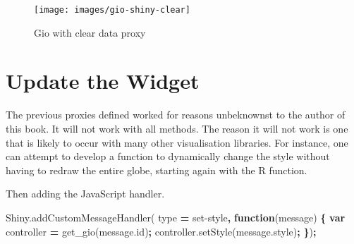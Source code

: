 \documentclass[
  10pt,
]{krantz}
\makeatletter
\newenvironment{Shaded}{\begin{snugshade}}{\end{snugshade}}
\newcommand{\AttributeTok}[1]{\textcolor[rgb]{0.61,0.61,0.61}{#1}}
\newcommand{\CommentTok}[1]{\textcolor[rgb]{0.37,0.37,0.37}{\textit{#1}}}
\newcommand{\ControlFlowTok}[1]{\textcolor[rgb]{0.27,0.27,0.27}{\textbf{#1}}}
\newcommand{\DataTypeTok}[1]{\textcolor[rgb]{0.27,0.27,0.27}{#1}}
\newcommand{\KeywordTok}[1]{\textcolor[rgb]{0.27,0.27,0.27}{\textbf{#1}}}
\newcommand{\NormalTok}[1]{#1}
\newcommand{\OperatorTok}[1]{\textcolor[rgb]{0.43,0.43,0.43}{\textbf{#1}}}
\newcommand{\StringTok}[1]{\textcolor[rgb]{0.5,0.5,0.5}{#1}}
\newcommand{\VariableTok}[1]{\textcolor[rgb]{0,0,0}{#1}}
\newenvironment{kframe}{%
\medskip{}
\setlength{\fboxsep}{.8em}
 \def\at@end@of@kframe{}%
 \ifinner\ifhmode%
  \def\at@end@of@kframe{\end{minipage}}%
  \begin{minipage}{\columnwidth}%
 \fi\fi%
 \def\FrameCommand##1{\hskip\@totalleftmargin \hskip-\fboxsep
 \colorbox{shadecolor}{##1}\hskip-\fboxsep
     \hskip-\linewidth \hskip-\@totalleftmargin \hskip\columnwidth}%
 \MakeFramed {\advance\hsize-\width
   \@totalleftmargin\z@ \linewidth\hsize
   \@setminipage}}%
 {\par\unskip\endMakeFramed%
 \at@end@of@kframe}
\renewenvironment{Shaded}{\begin{kframe}}{\end{kframe}}
\makeatother
\begin{document}
\begin{figure}[H]

{\centering \texttt{[image: images/gio-shiny-clear]} 

}

\caption{Gio with clear data proxy}\label{fig:giod-shiny-clear-data}
\end{figure}

\hypertarget{shiny-widgets-update}{%
\section{Update the Widget}\label{shiny-widgets-update}}

The previous proxies defined worked for reasons unbeknownst to the author of this book. It will not work with all methods. The reason it will not work is one that is likely to occur with many other visualisation libraries. For instance, one can attempt to develop a function to dynamically change the style without having to redraw the entire globe, starting again with the R function.

\begin{Shaded}
\end{Shaded}

Then adding the JavaScript handler.

\begin{Shaded}
\begin{Highlighting}[]
\VariableTok{Shiny}\NormalTok{.}\AttributeTok{addCustomMessageHandler}\NormalTok{(}
\NormalTok{  type }\OperatorTok{=} \StringTok{\textquotesingle{}set{-}style\textquotesingle{}}\OperatorTok{,} \KeywordTok{function}\NormalTok{(message) }\OperatorTok{\{}
    \KeywordTok{var}\NormalTok{ controller }\OperatorTok{=} \AttributeTok{get\_gio}\NormalTok{(}\VariableTok{message}\NormalTok{.}\AttributeTok{id}\NormalTok{)}\OperatorTok{;}
    \VariableTok{controller}\NormalTok{.}\AttributeTok{setStyle}\NormalTok{(}\VariableTok{message}\NormalTok{.}\AttributeTok{style}\NormalTok{)}\OperatorTok{;}
\OperatorTok{\}}\NormalTok{)}\OperatorTok{;}
\end{Highlighting}
\end{Shaded}
\end{document}
